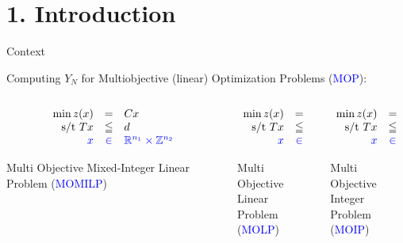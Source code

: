 \documentclass[10pt,xcolor=dvipsnames]{beamer}
\newcommand{\mR}{\mathbb{R}}
\newcommand{\mZ}{\mathbb{Z}}
\newcommand{\blue}{\textcolor{blue}}
\begin{document}
\section{1. Introduction}

\begin{frame}{Context}

\hspace{-3mm}Computing $Y_N$ for Multiobjective (linear) Optimization Problems (\blue{MOP}):


\begin{columns}
\begin{column}{0.33\textwidth}
$$
\begin{array}{rcl}
\min z(x) & = & {C}x\\
\hbox{s/t } Tx & \leqq & d\\
\blue{x} & \blue{\in} & 
\blue{\mR^{n_1} \times \mZ^{n_2}}
\notag
\end{array}
\vspace{2mm}
$$
\begin{center}
Multi Objective Mixed-Integer Linear Problem (\blue{MOMILP})
\end{center}
\end{column}
\begin{column}{0.33\textwidth}
$$
\begin{array}{rcl}
\min z(x) & = & {C}x\\
\hbox{s/t } Tx & \leqq & d\\
\blue{x} & \blue{\in} & 
\blue{\mR^{n_1}}
\notag
\end{array}
\vspace{2mm}
$$
\begin{center}
Multi Objective\\ Linear \\Problem (\blue{MOLP})
\end{center}
\end{column}
\begin{column}{0.33\textwidth}
$$
\begin{array}{rcl}
\min z(x) & = & {C}x\\
\hbox{s/t } Tx & \leqq & d\\
\blue{x} & \blue{\in} & 
\blue{\mZ^{n_2}}
\notag
\end{array}
\vspace{2mm}
$$
\begin{center}
Multi Objective\\ Integer \\Problem (\blue{MOIP})
\end{center}
\end{column}
\end{columns}
\vspace{2mm}


\end{frame}
\end{document}
